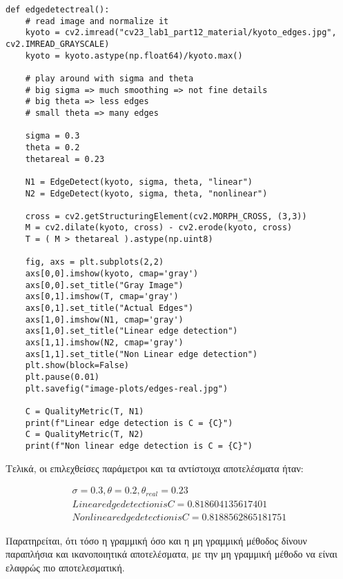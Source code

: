 \documentclass{article}
\begin{document}
\begin{lstlisting}[breaklines=true, showstringspaces=false]
def edgedetectreal():
    # read image and normalize it
    kyoto = cv2.imread("cv23_lab1_part12_material/kyoto_edges.jpg", cv2.IMREAD_GRAYSCALE)
    kyoto = kyoto.astype(np.float64)/kyoto.max()

    # play around with sigma and theta
    # big sigma => much smoothing => not fine details
    # big theta => less edges
    # small theta => many edges

    sigma = 0.3
    theta = 0.2
    thetareal = 0.23

    N1 = EdgeDetect(kyoto, sigma, theta, "linear")
    N2 = EdgeDetect(kyoto, sigma, theta, "nonlinear")

    cross = cv2.getStructuringElement(cv2.MORPH_CROSS, (3,3))
    M = cv2.dilate(kyoto, cross) - cv2.erode(kyoto, cross)
    T = ( M > thetareal ).astype(np.uint8)

    fig, axs = plt.subplots(2,2)
    axs[0,0].imshow(kyoto, cmap='gray')
    axs[0,0].set_title("Gray Image")
    axs[0,1].imshow(T, cmap='gray')
    axs[0,1].set_title("Actual Edges")
    axs[1,0].imshow(N1, cmap='gray')
    axs[1,0].set_title("Linear edge detection")
    axs[1,1].imshow(N2, cmap='gray')
    axs[1,1].set_title("Non Linear edge detection")
    plt.show(block=False)
    plt.pause(0.01)
    plt.savefig("image-plots/edges-real.jpg")

    C = QualityMetric(T, N1)
    print(f"Linear edge detection is C = {C}")
    C = QualityMetric(T, N2)
    print(f"Non linear edge detection is C = {C}")

\end{lstlisting}

Τελικά, οι επιλεχθείσες παράμετροι και τα αντίστοιχα αποτελέσματα ήταν:

\begin{equation}
    \begin{gathered}
        \sigma = 0.3, \theta = 0.2, \theta_{real} = 0.23 \\
        Linear edge detection is C = 0.818604135617401\\
        Non linear edge detection is C = 0.8188562865181751
    \end{gathered}
\end{equation}

Παρατηρείται, ότι τόσο η γραμμική όσο και η μη γραμμική μέθοδος δίνουν παραπλήσια και ικανοποιητικά αποτελέσματα, με την μη γραμμική μέθοδο να είναι ελαφρώς πιο αποτελεσματική.
\end{document}
